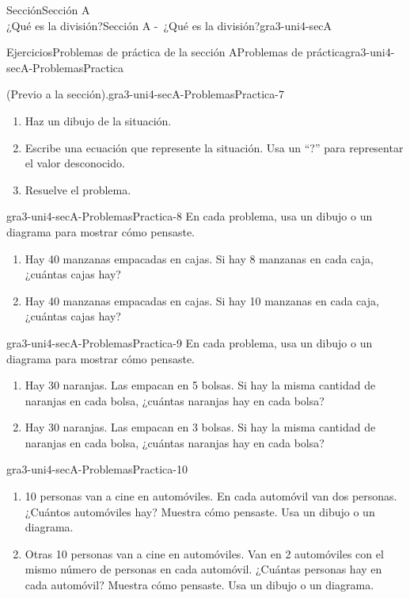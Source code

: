 \begin{sectionptx}{Sección}{{\Large Sección A\\}¿Qué es la división?}{}{Sección A -~¿Qué es la división?}{}{}{gra3-uni4-secA}
\begin{exercises-subsection}{Ejercicios}{Problemas de práctica de la sección A}{}{Problemas de práctica}{}{}{gra3-uni4-secA-ProblemasPractica}
\begin{divisionexercise}{5}{(Previo a la sección).}{}{gra3-uni4-secA-ProblemasPractica-7}
\par
%
\begin{enumerate}[label={(\alph*)}]
\item{}Haz un dibujo de la situación.%
\item{}Escribe una ecuación que represente la situación. Usa un “?” para representar el valor desconocido.%
\item{}Resuelve el problema.%
\end{enumerate}
%
\end{divisionexercise}%
\begin{divisionexercise}{6}{}{}{gra3-uni4-secA-ProblemasPractica-8}%
En cada problema, usa un dibujo o un diagrama para mostrar cómo pensaste.%
\par
%
\begin{enumerate}[label={(\alph*)}]
\item{}Hay 40 manzanas empacadas en cajas. Si hay 8 manzanas en cada caja, ¿cuántas cajas hay?%
\item{}Hay 40 manzanas empacadas en cajas. Si hay 10 manzanas en cada caja, ¿cuántas cajas hay?%
\end{enumerate}
%
\end{divisionexercise}%
\begin{divisionexercise}{7}{}{}{gra3-uni4-secA-ProblemasPractica-9}%
En cada problema, usa un dibujo o un diagrama para mostrar cómo pensaste.%
%
\begin{enumerate}[label={(\alph*)}]
\item{}Hay 30 naranjas. Las empacan en 5 bolsas. Si hay la misma cantidad de naranjas en cada bolsa, ¿cuántas naranjas hay en cada bolsa?%
\item{}Hay 30 naranjas. Las empacan en 3 bolsas. Si hay la misma cantidad de naranjas en cada bolsa, ¿cuántas naranjas hay en cada bolsa?%
\end{enumerate}
\end{divisionexercise}%
\begin{divisionexercise}{8}{}{}{gra3-uni4-secA-ProblemasPractica-10}%
%
\begin{enumerate}[label={(\alph*)}]
\item{}10 personas van a cine en automóviles. En cada automóvil van dos personas. ¿Cuántos automóviles hay? Muestra cómo pensaste. Usa un dibujo o un diagrama.%
\item{}Otras 10 personas van a cine en automóviles. Van en 2 automóviles con el mismo número de personas en cada automóvil. ¿Cuántas personas hay en cada automóvil? Muestra cómo pensaste. Usa un dibujo o un diagrama.%

\end{enumerate}
\end{divisionexercise}
\end{exercises-subsection}
\end{sectionptx}
